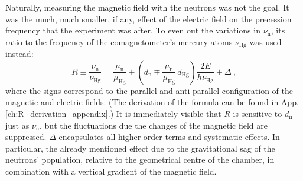 Naturally, measuring the magnetic field with the neutrons was not the goal. It was the much, much smaller, if any, effect of the electric field on the precession frequency that the experiment was after. To even out the variations in $\nu_\text{n}$, its ratio to the frequency of the comagnetometer's mercury atoms $\nu_\text{Hg}$ was used instead:
\begin{equation}
  \label{eq:Rdefinition}
  R \equiv \frac{\nu_\text{n}}{\nu_\text{Hg}} = \frac{\mu_\text{n}}{\mu_\text{Hg}} \pm \left( d_\text{n} \mp \frac{\mu_\text{n}}{\mu_\text{Hg}} \, d_\text{Hg} \right) \frac{2 E}{ h  \nu_\text{Hg}} + \Delta \ ,
\end{equation}
where the signs correspond to the parallel and anti-parallel configuration of the magnetic and electric fields. (The derivation of the formula can be found in App.\,\ref{ch:R_derivation_appendix}.)
It is immediately visible that $R$ is sensitive to $d_\text{n}$ just as $\nu_\text{n}$, but the fluctuations due the changes of the magnetic field are suppressed.
$\Delta$ encapsulates all higher-order terms and systematic effects. In particular, the already mentioned effect due to the gravitational sag of the neutrons' population, relative to the geometrical centre of the chamber, in combination with a vertical gradient of the magnetic field.



